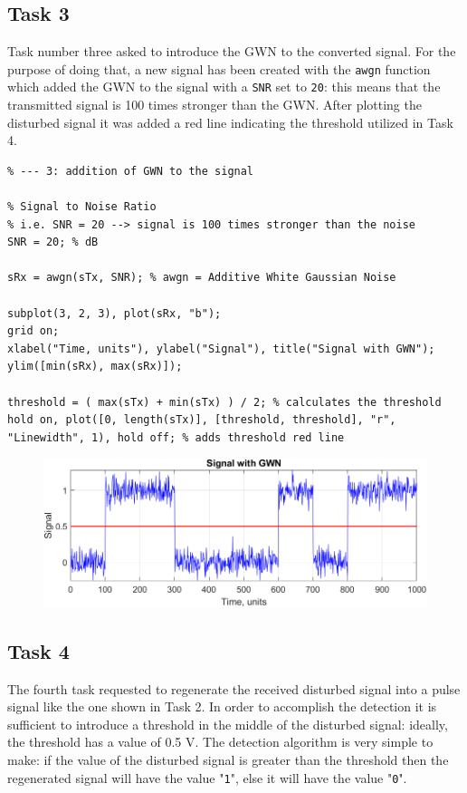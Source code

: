 % 
\subsection*{Task 3}
Task number three asked to introduce the GWN to the converted signal. For the purpose of doing that, a new signal has been created with the \texttt{awgn} function which added the GWN to the signal with a \texttt{SNR} set to \texttt{20}: this means that the transmitted signal is 100 times stronger than the GWN. After plotting the disturbed signal it was added a red line indicating the threshold utilized in Task 4.

\begin{lstlisting}
% --- 3: addition of GWN to the signal

% Signal to Noise Ratio
% i.e. SNR = 20 --> signal is 100 times stronger than the noise
SNR = 20; % dB

sRx = awgn(sTx, SNR); % awgn = Additive White Gaussian Noise

subplot(3, 2, 3), plot(sRx, "b");
grid on;
xlabel("Time, units"), ylabel("Signal"), title("Signal with GWN");
ylim([min(sRx), max(sRx)]);

threshold = ( max(sTx) + min(sTx) ) / 2; % calculates the threshold
hold on, plot([0, length(sTx)], [threshold, threshold], "r", "Linewidth", 1), hold off; % adds threshold red line
\end{lstlisting}

\begin{figure}[h!]
    \centering
    \includegraphics[width = .8\textwidth]{lab-1/imgs/noise_SNR20.png}
\end{figure}

% 
\subsection*{Task 4}
The fourth task requested to regenerate the received disturbed signal into a pulse signal like the one shown in Task 2. In order to accomplish the detection it is sufficient to introduce a threshold in the middle of the disturbed signal: ideally, the threshold has a value of 0.5 V. The detection algorithm is very simple to make: if the value of the disturbed signal is greater than the threshold then the regenerated signal will have the value "\texttt{1}", else it will have the value "\texttt{0}".

